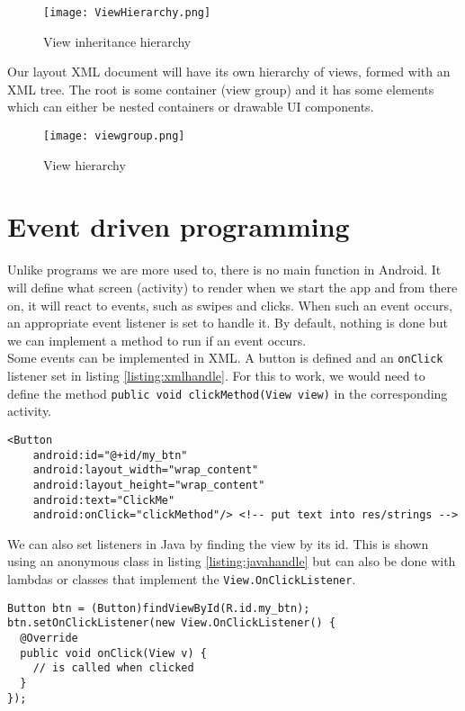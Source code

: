 \begin{figure}[H]
\centering
\texttt{[image: ViewHierarchy.png]}
\caption{View inheritance hierarchy}
\label{fig:inherhia}
\end{figure}

Our layout XML document will have its own hierarchy of views, formed with an XML tree. The root is some container (view group) and it has some elements which can either be nested containers or drawable UI components. 

\begin{figure}[H]
\centering
\texttt{[image: viewgroup.png]}
\caption{View hierarchy}
\label{fig:viewhia}
\end{figure}

\section{Event driven programming}
Unlike programs we are more used to, there is no main function in Android. It will define what screen (activity) to render when we start the app and from there on, it will react to events, such as swipes and clicks. When such an event occurs, an appropriate event listener is set to handle it. By default, nothing is done but we can implement a method to run if an event occurs.\\

Some events can be implemented in XML. A button is defined and an \texttt{onClick} listener set in listing \ref{listing:xmlhandle}. For this to work, we would need to define the method \texttt{public void clickMethod(View view)} in the corresponding activity.
\begin{lstlisting}[style=A_XML, caption={Handling events in XML}, label = {listing:xmlhandle}]
<Button
    android:id="@+id/my_btn"
    android:layout_width="wrap_content"
    android:layout_height="wrap_content"
    android:text="ClickMe" 
    android:onClick="clickMethod"/> <!-- put text into res/strings -->
\end{lstlisting}
We can also set listeners in Java by finding the view by its id. This is shown using an anonymous class in listing \ref{listing:javahandle} but can also be done with lambdas or classes that implement the \texttt{View.OnClickListener}.
\begin{lstlisting}[style=A_Java, caption={Handling events in Java}, label = {listing:javahandle}]
Button btn = (Button)findViewById(R.id.my_btn);
btn.setOnClickListener(new View.OnClickListener() {
  @Override
  public void onClick(View v) {
    // is called when clicked
  }
});
\end{lstlisting}

